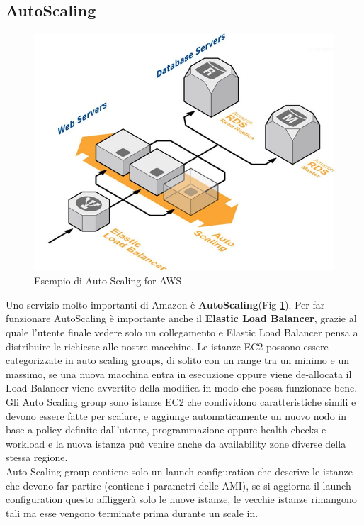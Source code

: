 \documentclass[11pt, twocolumn]{article}
\begin{document}
\subsection{AutoScaling}
\begin{figure}[!b]
	\centering
	\includegraphics[width=\linewidth]{imgs/load_balancer.jpg}
	\caption{Esempio di Auto Scaling for AWS}
	\label{fig:autoscaleAWS}
\end{figure}
Uno servizio molto importanti di Amazon è \textbf{AutoScaling}(Fig \ref{fig:autoscaleAWS}). Per far funzionare AutoScaling è importante anche il \textbf{Elastic Load Balancer}, grazie al quale l'utente finale vedere solo un collegamento e Elastic Load Balancer pensa a distribuire le richieste alle nostre macchine. 
Le istanze EC2 possono essere categorizzate in auto scaling groups, di solito con un range tra un minimo e un massimo, se una nuova macchina entra in esecuzione oppure viene de-allocata il Load Balancer viene avvertito della modifica in modo che possa funzionare bene.
Gli Auto Scaling group sono istanze EC2 che condividono caratteristiche simili e devono essere fatte per scalare, e aggiunge automaticamente un nuovo nodo in base a policy definite dall'utente, programmazione oppure health checks e workload e la nuova istanza può venire anche da availability zone diverse della stessa regione.\\
Auto Scaling group contiene solo un launch configuration che descrive le istanze che devono far partire (contiene i parametri delle AMI), se si aggiorna il launch configuration questo affliggerà solo le nuove istanze, le vecchie istanze rimangono tali ma esse vengono terminate prima durante un scale in.\\
\end{document}
